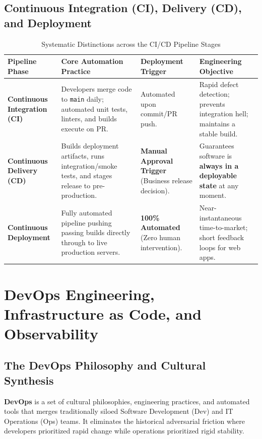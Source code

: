 \subsection{Continuous Integration (CI), Delivery (CD), and Deployment}
\begin{table}[htbp]
\centering
\small
\caption{Systematic Distinctions across the CI/CD Pipeline Stages}
\label{tab:cicd_pipeline}
\begin{tabularx}{\textwidth}{l p{4.2cm} p{3.5cm} X}
\toprule
\textbf{Pipeline Phase} & \textbf{Core Automation Practice} & \textbf{Deployment Trigger} & \textbf{Engineering Objective} \\
\midrule
\textbf{Continuous Integration (CI)} & Developers merge code to \texttt{main} daily; automated unit tests, linters, and builds execute on PR. & Automated upon commit/PR push. & Rapid defect detection; prevents integration hell; maintains a stable build. \\
\textbf{Continuous Delivery (CD)} & Builds deployment artifacts, runs integration/smoke tests, and stages release to pre-production. & \textbf{Manual Approval Trigger} (Business release decision). & Guarantees software is \textbf{always in a deployable state} at any moment. \\
\textbf{Continuous Deployment} & Fully automated pipeline pushing passing builds directly through to live production servers. & \textbf{100\% Automated} (Zero human intervention). & Near-instantaneous time-to-market; short feedback loops for web apps. \\
\bottomrule
\end{tabularx}
\end{table}

\section{DevOps Engineering, Infrastructure as Code, and Observability}
\label{sec:se_devops_iac}

\subsection{The DevOps Philosophy and Cultural Synthesis}
\textbf{DevOps} is a set of cultural philosophies, engineering practices, and automated tools that merges traditionally siloed Software Development (Dev) and IT Operations (Ops) teams. It eliminates the historical adversarial friction where developers prioritized rapid change while operations prioritized rigid stability.

